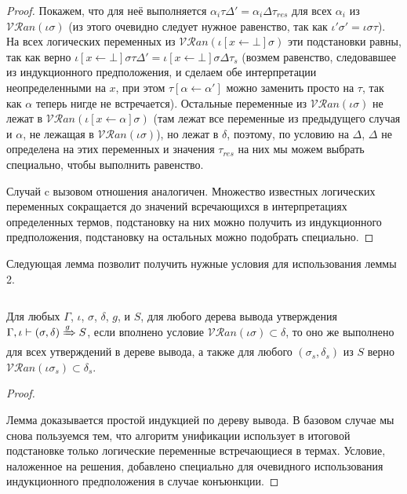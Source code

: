 \begin{proof}
      Покажем, что для неё выполняется $\alpha_i \tau \Delta' = \alpha_i \Delta \tau_{res}$ для всех $\alpha_i$ из $\mathcal{VR}an(\iota \sigma)$ (из этого очевидно следует нужное равенство, так как $\iota' \sigma' = \iota \sigma \tau$). На всех логических переменных из $\mathcal{VR}an(\iota[x \leftarrow \bot] \sigma)$ эти подстановки равны, так как верно $\iota[x \leftarrow \bot] \sigma \tau \Delta' = \iota[x \leftarrow \bot] \sigma \Delta \tau_s$ (возмем равенство, следовавшее из индукционного предположения, и сделаем обе интерпретации неопределенными на $x$, при этом $\tau[\alpha \leftarrow \alpha']$ можно заменить просто на $\tau$, так как $\alpha$ теперь нигде не встречается). Остальные переменные из $\mathcal{VR}an(\iota \sigma)$ не лежат в $\mathcal{VR}an(\iota[x \leftarrow \alpha] \sigma)$ (там лежат все переменные из предыдущего случая и $\alpha$, не лежащая в $\mathcal{VR}an(\iota \sigma)$), но лежат в $\delta$, поэтому, по условию на $\Delta$, $\Delta$ не определена на этих переменных и значения $\tau_{res}$ на них мы можем выбрать специально, чтобы выполнить равенство.
      
      Случай c вызовом отношения аналогичен. Множество известных логических переменных сокращается до значений всречающихся в интерпретациях определенных термов, подстановку на них можно получить из индукционного предположения, подстановку на остальных можно подобрать специально.
      
    \end{proof}
    
    Следующая лемма позволит получить нужные условия для использования леммы 2.
    
    \begin{lemma}$ $\par\nobreak\ignorespaces
    	  Для любых $\Gamma$, $\iota$, $\sigma$, $\delta$, $g$, и $S$, для любого дерева вывода утверждения $\Gamma, \iota \vdash (\sigma, \delta) \xRightarrow{g} S$, если вполнено условие $\mathcal{VR}an(\iota \sigma) \subset \delta$, то оно же выполнено для всех утверждений в дереве вывода, а также для любого $(\sigma_s, \delta_s)$ из $S$ верно $\mathcal{VR}an(\iota \sigma_s) \subset \delta_s$.
    	\end{lemma}
    \begin{proof}$ $\par\nobreak\ignorespaces
      Лемма доказывается простой индукцией по дереву вывода. В базовом случае мы снова пользуемся тем, что алгоритм унификации использует в итоговой подстановке только логические переменные встречающиеся в термах. Условие, наложенное на решения, добавлено специально для очевидного использования индукционного предположения в случае конъюнкции.
      
    \end{proof}
    
